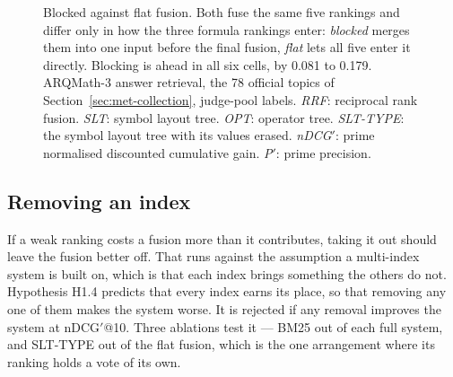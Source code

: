 \begin{figure}[t]
{}
\caption[Blocked against flat fusion]{Blocked against flat fusion. Both fuse the same five rankings and differ only in how the
three formula rankings enter: \emph{blocked} merges them into one input before the final fusion,
\emph{flat} lets all five enter it directly. Blocking is ahead in all six cells, by 0.081 to
0.179. ARQMath-3 answer retrieval, the 78 official topics of
Section~\ref{sec:met-collection}, judge-pool labels. \emph{RRF}: reciprocal rank fusion.
\emph{SLT}: symbol layout tree. \emph{OPT}: operator tree. \emph{SLT-TYPE}: the symbol layout
tree with its values erased. \emph{nDCG$'$}: prime normalised discounted cumulative gain.
\emph{P$'$}: prime precision.}
\label{fig:res-blocked-flat}
\end{figure}

\subsection{Removing an index}\label{sec:res-ablation}

If a weak ranking costs a fusion more than it contributes, taking it out should leave the fusion
better off. That runs against the assumption a multi-index system is built on, which is that each
index brings something the others do not. Hypothesis H1.4 predicts that every index
earns its place, so that removing any one of them makes the system worse. It is rejected
if any removal improves the system at nDCG$'$@10. Three ablations test it --- BM25 out of each
full system, and SLT-TYPE out of the flat fusion, which is the one arrangement where its ranking
holds a vote of its own.

